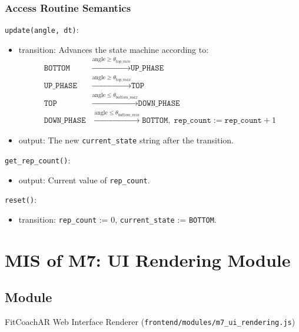 \documentclass[12pt, titlepage]{article}
\begin{document}
\subsubsection{Access Routine Semantics}

\noindent \texttt{update(angle, dt)}:
\begin{itemize}
  \item transition: Advances the state machine according to:
  \begin{align*}
    \texttt{BOTTOM} &\xrightarrow{\text{angle} \geq \theta_{top\_min}} \texttt{UP\_PHASE} \\
    \texttt{UP\_PHASE} &\xrightarrow{\text{angle} \geq \theta_{top\_max}} \texttt{TOP} \\
    \texttt{TOP} &\xrightarrow{\text{angle} \leq \theta_{bottom\_max}} \texttt{DOWN\_PHASE} \\
    \texttt{DOWN\_PHASE} &\xrightarrow{\text{angle} \leq \theta_{bottom\_min}} \texttt{BOTTOM},\; \texttt{rep\_count} := \texttt{rep\_count} + 1
  \end{align*}
  \item output: The new \texttt{current\_state} string after the transition.
\end{itemize}

\noindent \texttt{get\_rep\_count()}:
\begin{itemize}
  \item output: Current value of \texttt{rep\_count}.
\end{itemize}

\noindent \texttt{reset()}:
\begin{itemize}
  \item transition: \texttt{rep\_count} := 0, \texttt{current\_state} := \texttt{BOTTOM}.
\end{itemize}

\newpage

\newpage

\section{MIS of M7: UI Rendering Module} \label{M7}

\subsection{Module}
FitCoachAR Web Interface Renderer (\texttt{frontend/modules/m7\_ui\_rendering.js})
\end{document}

